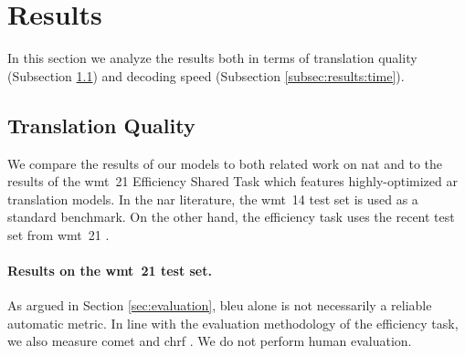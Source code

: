 






\section{Results}%
\label{sec:exp:results}

In this section we analyze the results both in terms of translation quality
(Subsection \ref{subsec:results:quality}) and decoding speed (Subsection
\ref{subsec:results:time}).


\subsection{Translation Quality}%
\label{subsec:results:quality}

We compare the results of our models to both related work on \ac{nat} and to
the results of the \ac{wmt}~21 Efficiency Shared Task which features
highly-optimized \ac{ar} translation models.  In the \ac{nar} literature, the
\acs{wmt}~14 test set \citep{bojar-etal-2014-findings} is used as a standard
benchmark. On the other hand, the efficiency task uses the recent test set from
\acs{wmt}~21 .

\paragraph{Results on the \acs{wmt}~21 test set.}
As argued in Section \ref{sec:evaluation}, \acs{bleu} alone is not necessarily
a reliable automatic metric. In line with the evaluation methodology of the
efficiency task, we also measure \acs{comet} \citep{rei-etal-2020-comet} and
\acs{chrf} \citep{popovic-2015-chrf}. We do not perform human evaluation.

